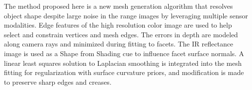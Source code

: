 The method proposed here is a new mesh generation algorithm that resolves object shape despite large noise in the range images by leveraging multiple sensor modalities.  Edge features of the high resolution color image are used to help select and constrain vertices and mesh edges.  The errors in depth are modeled along camera rays and minimized during fitting to facets.  The IR reflectance image is used as a Shape from Shading cue to influence facet surface normals.  A linear least squares solution to Laplacian smoothing is integrated into the mesh fitting for regularization with surface curvature priors, and modification is made to preserve sharp edges and creases.


